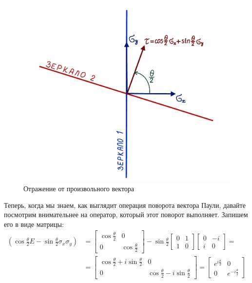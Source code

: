 \begin{figure}[h!]
\centering
\includegraphics[scale=0.27]{appendix/images/arbitrary vector.png}
\caption{Отражение от произвольного вектора}
\label{fig B.8}
\end{figure}

Теперь, когда мы знаем, как выглядит операция поворота вектора Паули, давайте посмотрим внимательнее на оператор, который этот поворот выполняет. Запишем его в виде матрицы:
\begin{align*}
\left(\cos\frac{\theta}{2}E - \sin\frac{\theta}{2}\sigma_x\sigma_y\right) &= \begin{bmatrix}\cos\frac{\theta}{2} & 0 \\ 0 & \cos\frac{\theta}{2}\end{bmatrix} - \sin\frac{\theta}{2}\begin{bmatrix}0 & 1 \\ 1 & 0\end{bmatrix}\begin{bmatrix}0 & -i \\ i & 0\end{bmatrix} = \\
&= \begin{bmatrix}\cos\frac{\theta}{2} + i\sin\frac{\theta}{2} & 0 \\ 0 & \cos\frac{\theta}{2} - i\sin\frac{\theta}{2}\end{bmatrix} = \begin{bmatrix}e^{i\frac{\theta}{2}} & 0 \\ 0 & e^{-i\frac{\theta}{2}}\end{bmatrix}
\end{align*}

